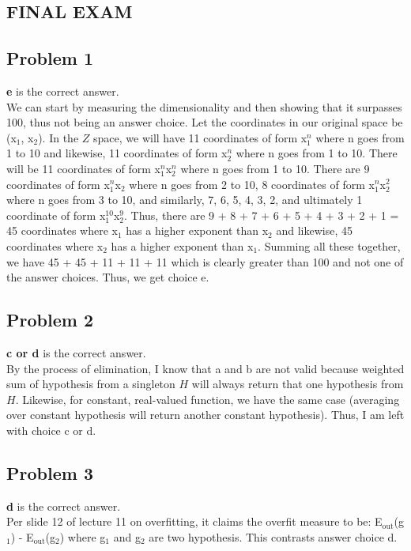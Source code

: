 \documentclass[12 pt]{article}
\begin{document}
	\begin{center}
		\section*{FINAL EXAM}
	\end{center}
	
	
	\subsection*{Problem 1}	
	\textbf{e} is the correct answer. \\
	We can start by measuring the dimensionality and then showing that it surpasses 100, thus not being an answer choice. Let the coordinates in our original space be (x$_1$, x$_2$). In the $Z$ space, we will have 11 coordinates of form x$_1^n$ where n goes from 1 to 10 and likewise, 11 coordinates of form x$_2^n$ where n goes from 1 to 10. There will be 11 coordinates of form x$_1^n$x$_2^n$ where n goes from 1 to 10. There are 9 coordinates of form x$_1^n$x$_2$ where n goes from 2 to 10, 8 coordinates of form x$_1^n$x$_2^2$ where n goes from 3 to 10, and similarly, 7, 6, 5, 4, 3, 2, and ultimately 1 coordinate of form x$_1^{10}$x$_2^9$. Thus, there are 9 + 8 + 7 + 6 + 5 + 4 + 3 + 2 + 1 = 45 coordinates where x$_1$ has a higher exponent than x$_2$ and likewise, 45 coordinates where x$_2$ has a higher exponent than x$_1$. Summing all these together, we have 45 + 45 + 11 + 11 + 11 which is clearly greater than 100 and not one of the answer choices. Thus, we get choice e.

	
	\subsection*{Problem 2}
	\textbf{c or d} is the correct answer. \\
	By the process of elimination, I know that a and b are not valid because weighted sum of hypothesis from a singleton $H$ will always return that one hypothesis from $H$. Likewise, for constant, real-valued function, we have the same case (averaging over constant hypothesis will return another constant hypothesis). Thus, I am left with choice c or d.
	
	\subsection*{Problem 3}
	\textbf{d} is the correct answer.\\
	Per slide 12 of lecture 11 on overfitting, it claims the overfit measure to be: E$_{\text{out}}$(g$_1$) - E$_{\text{out}}$(g$_2$) where g$_1$ and g$_2$ are two hypothesis. This contrasts answer choice d.
	
\end{document}
